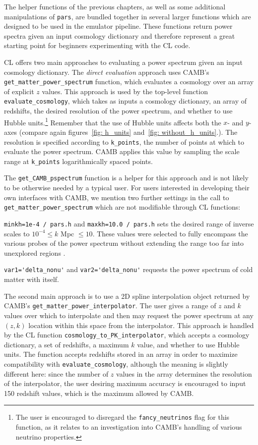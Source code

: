 
The helper functions of the previous chapters, as well as some additional
manipulations of \verb|pars|, are bundled together in several larger
functions which are designed to be used in the emulator pipeline. These
functions return power spectra given an input cosmology dictionary and
therefore represent a great starting point for beginners experimenting with
the CL code.

CL offers two main approaches to evaluating a power spectrum given an input
cosmology dictionary. The \textit{direct evaluation} approach uses CAMB's 
\verb|get_matter_power_spectrum| function, which evaluates a cosmology over
an array of explicit $z$ values. This approach is used by the top-level
function \verb|evaluate_cosmology|, which takes as inputs a 
cosmology dictionary, an array of redshifts, the desired resolution of the
power spectrum, and whether to use Hubble
units.\footnote{The user is encouraged to disregard the
\verb|fancy_neutrinos| flag for this function, as it relates
to an investigation into CAMB's handling of various neutrino properties.}
Remember that the use of Hubble units affects both the $x$- and
$y$-axes (compare again figures~\ref{fig: h_units}
and~\ref{fig: without_h_units}.). The resolution is specified according to
\verb|k_points|, the number of points at which to evaluate
the power spectrum. CAMB applies this value by sampling the scale range at
\verb|k_points| logarithmically spaced points.

The \verb|get_CAMB_pspectrum| 
function is a helper for this approach and is not likely to be otherwise 
needed by a typical user. For users interested in
developing their own interfaces with CAMB, we mention two further
settings in the call to \verb|get_matter_power_spectrum| which are not
modifiable through CL functions:

\verb|minkh=1e-4 / pars.h| and \verb|maxkh=10.0 / pars.h|
\quad sets the desired
range of inverse scales to $10^{-4} \leq k$ Mpc $\leq 10$. These values were
selected to fully encompass the various probes of the power spectrum without
extending the range too far into unexplored regions . 

\verb|var1='delta_nonu'| and \verb|var2='delta_nonu'| requests the power
spectrum of cold matter with itself.

The second main approach is to use a 2D spline interpolation object returned
by CAMB's \verb|get_matter_power_interpolator|. The user gives a
range of $z$ and $k$ values over which to interpolate and then may request
the power spectrum at any $(z, k)$ location within this space from the
interpolator. This approach is handled by the CL function
\verb|cosmology_to_PK_interpolator|, which accepts a cosmology dictionary,
a set of redshifts, a maximum $k$ value, and whether to use Hubble units.
The function accepts redshifts stored in an array in order to maximize
compatibility with \verb|evaluate_cosmology|, although the meaning is slightly
different here: since the number of $z$ values in the array determines the
resolution of the interpolator, the user desiring maximum accuracy is
encouraged to input 150 redshift values, which is the maximum allowed by CAMB.

